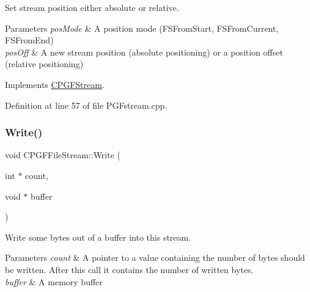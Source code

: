 Set stream position either absolute or relative. 
\begin{DoxyParams}{Parameters}
{\em pos\+Mode} & A position mode (F\+S\+From\+Start, F\+S\+From\+Current, F\+S\+From\+End) \\
\hline
{\em pos\+Off} & A new stream position (absolute positioning) or a position offset (relative positioning) \\
\hline
\end{DoxyParams}


Implements \mbox{\hyperlink{classCPGFStream_a69be67d4b04cd056c4f74d8147349a16}{C\+P\+G\+F\+Stream}}.



Definition at line 57 of file P\+G\+Fstream.\+cpp.


\begin{DoxyCode}{0}

\end{DoxyCode}
\mbox{\label{classCPGFFileStream_a28a060662951edf72f7739ba575c9fff}} 
\subsubsection{\texorpdfstring{Write()}{Write()}}
{\footnotesize\ttfamily void C\+P\+G\+F\+File\+Stream\+::\+Write (\begin{DoxyParamCaption}\item[{int $\ast$}]{count,  }\item[{void $\ast$}]{buffer }\end{DoxyParamCaption})\hspace{0.3cm}{\ttfamily [virtual]}}

Write some bytes out of a buffer into this stream. 
\begin{DoxyParams}{Parameters}
{\em count} & A pointer to a value containing the number of bytes should be written. After this call it contains the number of written bytes. \\
\hline
{\em buffer} & A memory buffer \\
\hline
\end{DoxyParams}


